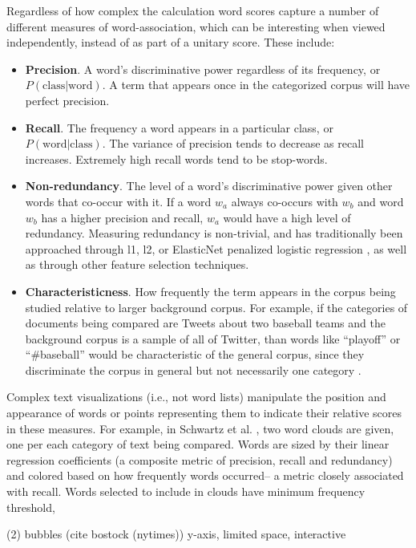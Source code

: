 \documentclass[11pt]{article}
\begin{document}
Regardless of how complex the calculation word scores capture a number of different measures of word-association, which can be interesting when viewed independently, instead of as part of a unitary score.  These include: 

\begin{itemize}  
\item \textbf{Precision}. A word's discriminative power regardless of its frequency, or $P(\mbox{class}|\mbox{word}).$  A term that appears once in the categorized corpus will have perfect precision.
\item \textbf{Recall}. The frequency a word appears in a particular class, or $P(\mbox{word}|\mbox{class})$.  The variance of precision tends to decrease as recall increases.  Extremely high recall words tend to be stop-words. 
\item \textbf{Non-redundancy}. The level of a word's discriminative power given other words that co-occur with it.  If a word $w_a$ always co-occurs with $w_b$ and word $w_b$ has a higher precision and recall, $w_a$ would have a high level of redundancy. Measuring redundancy is non-trivial, and has traditionally been approached through l1, l2, or ElasticNet penalized logistic regression \cite{joshi2010}, as well as through other feature selection techniques.  
\item \textbf{Characteristicness}. How frequently the term appears in the corpus being studied relative to larger background corpus.  For example, if the categories of documents being compared are Tweets about two baseball teams and the background corpus is a sample of all of Twitter, than words like ``playoff'' or ``\#baseball'' would be characteristic of the general corpus, since they discriminate the corpus in general but not necessarily one category \cite{vennclouds}.
\end{itemize}

Complex text visualizations (i.e., not word lists) manipulate the position and appearance of words or points representing them to indicate their relative scores in these measures. For example, in Schwartz et al. , two word clouds are given, one per each category of text being compared.  Words are sized by their linear regression coefficients (a composite metric of precision, recall and redundancy) and colored based on how frequently words occurred-- a metric closely associated with recall.  Words selected to include in clouds have minimum frequency threshold, 

(2) bubbles (cite bostock (nytimes)) y-axis, limited space, interactive
\end{document}
